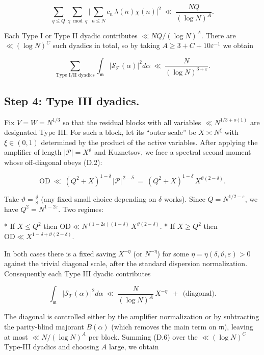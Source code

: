 \documentclass[11pt]{article}
\theoremstyle{definition}
\theoremstyle{remark}
\begin{document}
$$
\sum_{q\le Q}\sum_{\chi\bmod q}
\Big|\sum_{n\le N} c_n\,\lambda(n)\chi(n)\Big|^2
\ \ll\ \frac{NQ}{(\log N)^A}.
$$

Each Type I or Type II dyadic contributes $\ll NQ/(\log N)^A$. There are $\ll(\log N)^C$ such dyadics in total, so by taking $A\ge 3+C+10\varepsilon^{-1}$ we obtain

\begin{equation}
\sum_{\text{Type I/II dyadics}}
\int_{\mathfrak m}\big|\mathcal S_{\mathcal T}(\alpha)\big|^2 d\alpha
\ \ll\ \frac{N}{(\log N)^{3+\varepsilon}}.
\tag{D.5}
\end{equation}

\subsection*{Step 4: Type III dyadics.}
Fix $V=W=N^{1/3}$ so that the residual blocks with all variables $\ll N^{1/3+o(1)}$ are designated Type III. For such a block, let its “outer scale” be $X\asymp N^\xi$ with $\xi\in(0,1)$ determined by the product of the active variables. After applying the amplifier of length $|\mathcal P|=X^\vartheta$ and Kuznetsov, we face a spectral second moment whose off-diagonal obeys (D.2):

$$
\mathrm{OD}\ \ll\ (Q^2+X)^{1-\delta}\,|\mathcal P|^{\,2-\delta}
\ =\ (Q^2+X)^{1-\delta}\,X^{\vartheta(2-\delta)}.
$$

Take $\vartheta=\tfrac{\delta}{8}$ (any fixed small choice depending on $\delta$ works). Since $Q=N^{1/2-\varepsilon}$, we have $Q^2=N^{1-2\varepsilon}$. Two regimes:

* If $X\le Q^2$ then $\mathrm{OD}\ll N^{(1-2\varepsilon)(1-\delta)}\,X^{\vartheta(2-\delta)}$.
* If $X\ge Q^2$ then $\mathrm{OD}\ll X^{1-\delta+\vartheta(2-\delta)}$.

In both cases there is a fixed saving $X^{-\eta}$ (or $N^{-\eta}$) for some $\eta=\eta(\delta,\vartheta,\varepsilon)>0$ against the trivial diagonal scale, after the standard dispersion normalization. Consequently each Type III dyadic contributes

\begin{equation}
\int_{\mathfrak m}\big|\mathcal S_{\mathcal T}(\alpha)\big|^2 d\alpha
\ \ll\ \frac{N}{(\log N)^{A}}\,X^{-\eta}
\ \ +\ \ \text{(diagonal)}.
\tag{D.6}
\end{equation}

The diagonal is controlled either by the amplifier normalization or by subtracting the parity-blind majorant $B(\alpha)$ (which removes the main term on $\mathfrak m$), leaving at most $\ll N/(\log N)^A$ per block. Summing (D.6) over the $\ll(\log N)^C$ Type-III dyadics and choosing $A$ large, we obtain
\end{document}
